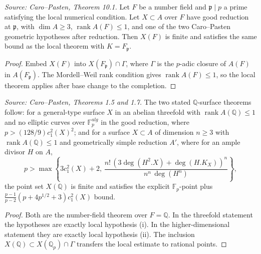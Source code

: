 \begin{theorem}
  \label{thm:cp_number_field_bound}
  \textit{Source: Caro--Pasten, Theorem 10.1.}
  Let \(F\) be a number field and \(\mathfrak p\mid p\) a prime satisfying the
  local numerical condition.  Let \(X\subset A\) over \(F\) have good reduction
  at \(\mathfrak p\), with \(\dim A\ge3\), \(\operatorname{rank}A(F)\le1\),
  and one of the two Caro--Pasten geometric hypotheses after reduction.  Then
  \(X(F)\) is finite and satisfies the same bound as the local theorem with
  \(K=F_{\mathfrak p}\).
\end{theorem}
\begin{proof}
  Embed \(X(F)\) into \(X(F_{\mathfrak p})\cap\Gamma\), where \(\Gamma\) is
  the \(p\)-adic closure of \(A(F)\) in \(A(F_{\mathfrak p})\).  The
  Mordell--Weil rank condition gives \(\operatorname{rank}A(F)\le1\), so the
  local theorem applies after base change to the completion.
\end{proof}

\begin{theorem}
  \label{thm:cp_intro_surface_bounds}
  \textit{Source: Caro--Pasten, Theorems 1.5 and 1.7.}
  The two stated \(\mathbb Q\)-surface theorems follow: for a general-type
  surface \(X\) in an abelian threefold with \(\operatorname{rank}A(\mathbb Q)\le1\)
  and no elliptic curves over \(\mathbb F_p^{alg}\) in the good reduction, where
  \(p>(128/9)c_1^2(X)^2\); and for a surface \(X\subset A\) of dimension
  \(n\ge3\) with \(\operatorname{rank}A(\mathbb Q)\le1\) and geometrically
  simple reduction \(A'\), where for an ample divisor \(H\) on \(A\),
  \[
    p>\max\left\{3c_1^2(X)+2,\,
      \frac{n!\,(3\deg(H^2.X)+\deg(H.K_X))^n}{n^n\,\deg(H^n)}\right\},
  \]
  the point set \(X(\mathbb Q)\) is finite and satisfies the explicit
  \(\mathbb F_p\)-point plus
  \(\frac{p-1}{p-2}(p+4p^{1/2}+3)c_1^2(X)\) bound.
\end{theorem}
\begin{proof}
  Both are the number-field theorem over \(F=\mathbb Q\).  In the threefold
  statement the hypotheses are exactly local hypothesis (i).  In the
  higher-dimensional statement they are exactly local hypothesis (ii).  The
  inclusion \(X(\mathbb Q)\subset X(\mathbb Q_p)\cap\Gamma\) transfers the
  local estimate to rational points.
\end{proof}

